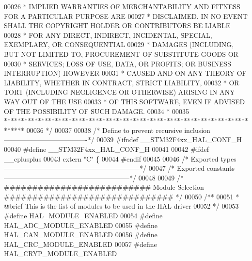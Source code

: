 \begin{DoxyCode}
00026 \textcolor{comment}{  * IMPLIED WARRANTIES OF MERCHANTABILITY AND FITNESS FOR A PARTICULAR PURPOSE ARE}
00027 \textcolor{comment}{  * DISCLAIMED. IN NO EVENT SHALL THE COPYRIGHT HOLDER OR CONTRIBUTORS BE LIABLE}
00028 \textcolor{comment}{  * FOR ANY DIRECT, INDIRECT, INCIDENTAL, SPECIAL, EXEMPLARY, OR CONSEQUENTIAL}
00029 \textcolor{comment}{  * DAMAGES (INCLUDING, BUT NOT LIMITED TO, PROCUREMENT OF SUBSTITUTE GOODS OR}
00030 \textcolor{comment}{  * SERVICES; LOSS OF USE, DATA, OR PROFITS; OR BUSINESS INTERRUPTION) HOWEVER}
00031 \textcolor{comment}{  * CAUSED AND ON ANY THEORY OF LIABILITY, WHETHER IN CONTRACT, STRICT LIABILITY,}
00032 \textcolor{comment}{  * OR TORT (INCLUDING NEGLIGENCE OR OTHERWISE) ARISING IN ANY WAY OUT OF THE USE}
00033 \textcolor{comment}{  * OF THIS SOFTWARE, EVEN IF ADVISED OF THE POSSIBILITY OF SUCH DAMAGE.}
00034 \textcolor{comment}{  *}
00035 \textcolor{comment}{  ******************************************************************************}
00036 \textcolor{comment}{  */}
00037 
00038 \textcolor{comment}{/* Define to prevent recursive inclusion -------------------------------------*/}
00039 \textcolor{preprocessor}{#}\textcolor{preprocessor}{ifndef} \textcolor{preprocessor}{\_\_STM32F4xx\_HAL\_CONF\_H}
00040 \textcolor{preprocessor}{#}\textcolor{preprocessor}{define} \textcolor{preprocessor}{\_\_STM32F4xx\_HAL\_CONF\_H}
00041 
00042 \textcolor{preprocessor}{#}\textcolor{preprocessor}{ifdef} \_\_cplusplus
00043  \textcolor{keyword}{extern} \textcolor{stringliteral}{"C"} \{
00044 \textcolor{preprocessor}{#}\textcolor{preprocessor}{endif}
00045 
00046 \textcolor{comment}{/* Exported types ------------------------------------------------------------*/}
00047 \textcolor{comment}{/* Exported constants --------------------------------------------------------*/}
00048 
00049 \textcolor{comment}{/* ########################## Module Selection ############################## */}
00050 \textcolor{comment}{/**}
00051 \textcolor{comment}{  * @brief This is the list of modules to be used in the HAL driver }
00052 \textcolor{comment}{  */}
00053 \textcolor{preprocessor}{#}\textcolor{preprocessor}{define} \textcolor{preprocessor}{HAL\_MODULE\_ENABLED}
00054 \textcolor{preprocessor}{#}\textcolor{preprocessor}{define} \textcolor{preprocessor}{HAL\_ADC\_MODULE\_ENABLED}
00055 \textcolor{preprocessor}{#}\textcolor{preprocessor}{define} \textcolor{preprocessor}{HAL\_CAN\_MODULE\_ENABLED}
00056 \textcolor{preprocessor}{#}\textcolor{preprocessor}{define} \textcolor{preprocessor}{HAL\_CRC\_MODULE\_ENABLED}
00057 \textcolor{preprocessor}{#}\textcolor{preprocessor}{define} \textcolor{preprocessor}{HAL\_CRYP\_MODULE\_ENABLED}

\end{DoxyCode}
